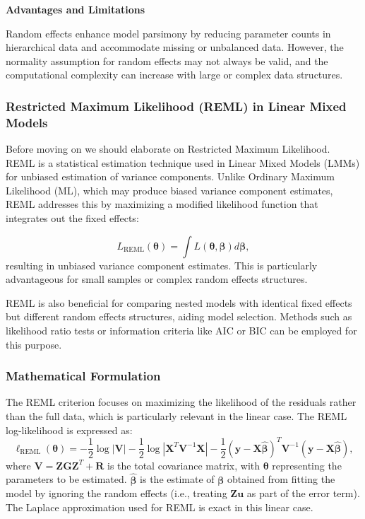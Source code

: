 \documentclass[12pt, twoside,hidelinks]{article}
\theoremstyle{definition}
\numberwithin{equation}{section}
\begin{document}
\textbf{Advantages and Limitations}

Random effects enhance model parsimony by reducing parameter counts in hierarchical data and accommodate missing or unbalanced data. However, the normality assumption for random effects may not always be valid, and the computational complexity can increase with large or complex data structures.

\subsubsection{Restricted Maximum Likelihood (REML) in Linear Mixed Models}

Before moving on we should elaborate on Restricted Maximum Likelihood. REML is a statistical estimation technique used in Linear Mixed Models (LMMs) for unbiased estimation of variance components. Unlike Ordinary Maximum Likelihood (ML), which may produce biased variance component estimates, REML addresses this by maximizing a modified likelihood function that integrates out the fixed effects:

\begin{equation}
L_{\text{REML}}(\boldsymbol{\theta}) = \int L(\boldsymbol{\theta}, \boldsymbol{\beta}) d\boldsymbol{\beta},
\label{eq:reml_likelihood}
\end{equation}
resulting in unbiased variance component estimates. This is particularly advantageous for small samples or complex random effects structures.

REML is also beneficial for comparing nested models with identical fixed effects but different random effects structures, aiding model selection. Methods such as likelihood ratio tests or information criteria like AIC or BIC can be employed for this purpose.

\subsubsection{Mathematical Formulation}

The REML criterion focuses on maximizing the likelihood of the residuals rather than the full data, which is particularly relevant in the linear case. The REML log-likelihood is expressed as:
\begin{equation}
\ell_{\text{REML}}(\boldsymbol{\theta}) = -\frac{1}{2} \log |\mathbf{V}| -\frac{1}{2} \log |\mathbf{X}^T \mathbf{V}^{-1} \mathbf{X}| -\frac{1}{2} (\mathbf{y} - \mathbf{X}\boldsymbol{\hat{\beta}})^T \mathbf{V}^{-1} (\mathbf{y} - \mathbf{X}\boldsymbol{\hat{\beta}}),
\label{eq:reml_log_likelihood}
\end{equation}
where \(\mathbf{V} = \mathbf{Z}\mathbf{G}\mathbf{Z}^T + \mathbf{R}\) is the total covariance matrix, with \(\boldsymbol{\theta}\) representing the parameters to be estimated. $\boldsymbol{\hat{\beta}}$
is the estimate of $\boldsymbol{\beta}$ obtained from fitting the model by ignoring the random effects (i.e., treating $\boldsymbol{Zu}$ as part of the error term). The Laplace approximation used for REML is exact in this linear case. 
\newline
\end{document}
